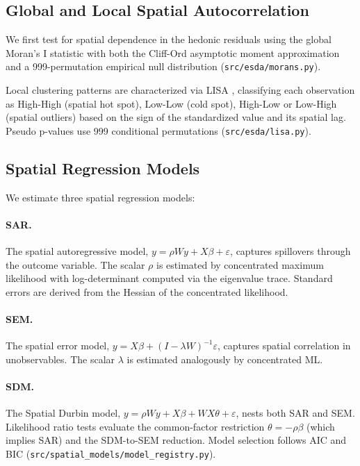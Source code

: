 \documentclass[12pt]{article}
\begin{document}
\subsection{Global and Local Spatial Autocorrelation}

We first test for spatial dependence in the hedonic residuals using the global
Moran's I statistic \citep{CliffOrd1981} with both the Cliff-Ord asymptotic
moment approximation and a 999-permutation empirical null distribution
(\texttt{src/esda/morans.py}).

Local clustering patterns are characterized via LISA \citep{Anselin1995},
classifying each observation as High-High (spatial hot spot), Low-Low (cold spot),
High-Low or Low-High (spatial outliers) based on the sign of the standardized
value and its spatial lag. Pseudo p-values use 999 conditional permutations
(\texttt{src/esda/lisa.py}).

\subsection{Spatial Regression Models}

We estimate three spatial regression models:

\paragraph{SAR.} The spatial autoregressive model,
$y = \rho W y + X\beta + \varepsilon$,
captures spillovers through the outcome variable. The scalar $\rho$ is
estimated by concentrated maximum likelihood with log-determinant computed
via the eigenvalue trace. Standard errors are derived from the Hessian of
the concentrated likelihood.

\paragraph{SEM.} The spatial error model,
$y = X\beta + (I - \lambda W)^{-1}\varepsilon$,
captures spatial correlation in unobservables. The scalar $\lambda$ is
estimated analogously by concentrated ML.

\paragraph{SDM.} The Spatial Durbin model,
$y = \rho W y + X\beta + WX\theta + \varepsilon$,
nests both SAR and SEM. Likelihood ratio tests evaluate the common-factor
restriction $\theta = -\rho\beta$ (which implies SAR) and the SDM-to-SEM
reduction. Model selection follows AIC and BIC (\texttt{src/spatial\_models/model\_registry.py}).
\end{document}
